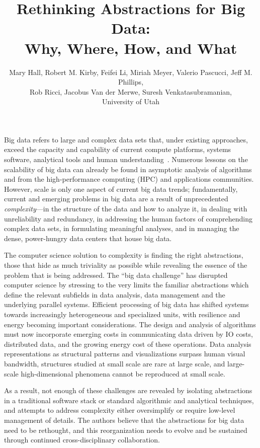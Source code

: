 \documentclass{article}
\title{Rethinking Abstractions for Big Data: \\ Why, Where, How, and What}
\author{ \small
Mary Hall,
Robert M. Kirby,
Feifei Li, 
Miriah Meyer,
Valerio Pascucci,
Jeff M. Phillips, 
\\ \small
Rob Ricci, 
Jacobus Van der Merwe,
Suresh Venkatasubramanian,  
\\ \small University of Utah
}
\begin{document}
\maketitle



Big data refers to large and complex data sets that, under existing approaches, exceed the capacity and capability of current compute platforms, systems software, analytical tools and human understanding~\cite{Mckinsey}. 
Numerous lessons on the scalability of big data can already be found in asymptotic analysis of algorithms and from the high-performance computing (HPC) and applications communities.  
However, scale is only one aspect of current big data trends; fundamentally, current and emerging problems in big data are a result of unprecedented \emph{complexity}---in the structure of the data and how to analyze it, in dealing with unreliability and redundancy,
in addressing the human factors of comprehending complex data sets, in formulating meaningful analyses, and in managing the dense, power-hungry data centers that 
house big data.

The computer science solution to complexity is finding the right abstractions, those that hide as much triviality as possible while revealing the essence of the problem that is being addressed. 
The ``big data challenge'' has disrupted computer science by stressing to the 
very limits the familiar abstractions which define the relevant subfields in data analysis, data management and the underlying parallel systems.
Efficient processing of big data has shifted systems towards increasingly heterogeneous and specialized units, with resilience and energy becoming important considerations. 
The design and analysis of algorithms must now incorporate emerging costs in communicating data driven by IO costs, distributed data, and the growing energy cost of these operations.  
Data analysis representations as structural patterns and visualizations surpass human visual bandwidth, structures studied at small scale are rare at large scale, and large-scale high-dimensional phenomena cannot be reproduced at small scale. 

As a result, not enough of these challenges are revealed by isolating abstractions in a traditional software stack or standard algorithmic and analytical techniques, and attempts to address complexity either oversimplify or require low-level management of details.
The authors believe that the abstractions for big data need to be rethought, and this reorganization needs to evolve and be sustained through continued cross-disciplinary collaboration.
\end{document}
